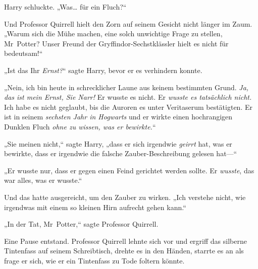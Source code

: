 Harry schluckte. „Was… für ein Fluch?“

Und Professor Quirrell hielt den Zorn auf seinem Gesicht nicht länger im Zaum. „Warum sich die Mühe machen, eine solch unwichtige Frage zu stellen, Mr~Potter? Unser Freund der Gryffindor-Sechstklässler hielt es nicht für bedeutsam!“

„Ist das Ihr \emph{Ernst?}“ sagte Harry, bevor er es verhindern konnte.

„Nein, ich bin heute in schrecklicher Laune aus keinem bestimmten Grund. \emph{Ja, das ist mein Ernst, Sie Narr!} Er wusste es nicht. Er \emph{wusste es tatsächlich nicht.} Ich habe es nicht geglaubt, bis die Auroren es unter Veritaserum bestätigten. Er ist in seinem \emph{sechsten Jahr in Hogwarts} und er wirkte einen hochrangigen Dunklen Fluch \emph{ohne zu wissen, was er bewirkte.}“

„Sie meinen nicht,“ sagte Harry, „dass er sich irgendwie \emph{geirrt} hat, was er bewirkte, dass er irgendwie die falsche Zauber-Beschreibung gelesen hat—“

„Er wusste nur, dass er gegen einen Feind gerichtet werden sollte. Er \emph{wusste}, das war alles, was er wusste.“

Und das hatte ausgereicht, um den Zauber zu wirken. „Ich verstehe nicht, wie irgendwas mit einem so kleinen Hirn aufrecht gehen kann.“

„In der Tat, Mr~Potter,“ sagte Professor Quirrell.

Eine Pause entstand. Professor Quirrell lehnte sich vor und ergriff das silberne Tintenfass auf seinem Schreibtisch, drehte es in den Händen, starrte es an als frage er sich, wie er ein Tintenfass zu Tode foltern könnte.

